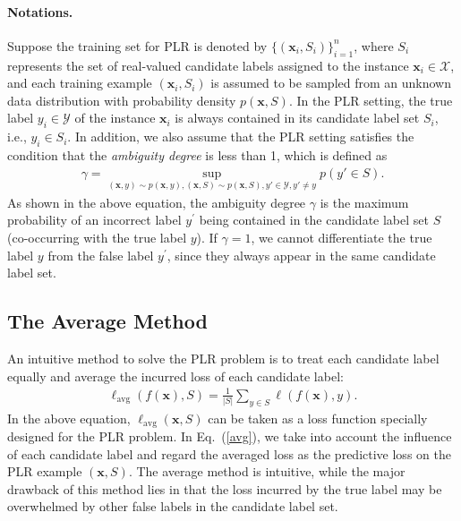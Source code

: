 \documentclass[letterpaper]{article} %
\begin{document}
\paragraph{Notations.} Suppose the training set for PLR is denoted by $\{(\bm{x}_i,S_i)\}_{i=1}^n$, where $S_i$ represents the set of real-valued candidate labels assigned to the instance $\bm{x}_i\in\mathcal{X}$, and each training example $(\bm{x}_i, S_i)$ is assumed to be sampled from an unknown data distribution with probability density $p(\bm{x}, S)$. In the PLR setting, the true label $y_i\in\mathcal{Y}$ of the instance $\bm{x}_i$ is always contained in its candidate label set $S_i$, i.e., $y_i\in S_i$. In addition, we also assume that the PLR setting satisfies the condition that the \emph{ambiguity degree} \cite{cour2011learning} is less than 1, which is defined as
\begin{gather}
\nonumber
\gamma = \sup_{(\bm{x},y)\sim p(\bm{x},y),(\bm{x},S)\sim p(\bm{x},S),y' \in \mathcal{Y},y' \neq y} p(y' \in S).
\end{gather}
As shown in the above equation, the ambiguity degree $\gamma$ is the maximum probability of an incorrect label $y^\prime$ being contained in the candidate label set $S$ (co-occurring with the true label $y$). If $\gamma=1$, we cannot differentiate the true label $y$ from the false label $y^\prime$, since they always appear in the same candidate label set.

\subsection{The Average Method}
An intuitive method to solve the PLR problem is to treat each candidate label equally and average the incurred loss of each candidate label:
\begin{gather}
\label{avg}
\ell_{\mathrm{avg}}(f(\bm{x}), S) = \frac{1}{|S|}\sum\nolimits_{y\in S}\ell(f(\bm{x}), y).
\end{gather}
In the above equation, $\ell_{\mathrm{avg}}(\bm{x}, S)$ can be taken as a loss function specially designed for the PLR problem. In Eq.~(\ref{avg}), we take into account the influence of each candidate label and regard the averaged loss as the predictive loss on the PLR example $(\bm{x},S)$. The average method is intuitive, while the major drawback of this method lies in that the loss incurred by the true label may be overwhelmed by other false labels in the candidate label set.
\end{document}
